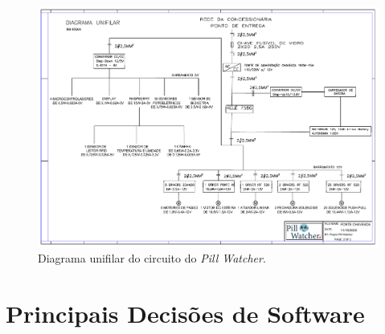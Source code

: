 \begin{apendicesenv}
\begin{landscape}
\begin{figure}[!htb]
    \centering
     \includegraphics[width=1.2\textwidth, height=2\textheight,keepaspectratio]{figuras/diagrama.pdf}
    \caption{Diagrama unifilar do circuito do \textit{Pill Watcher}.}
    \label{fig:diagrama_fonte2}
\end{figure}
\end{landscape}


\chapter{Principais Decisões de Software}\label{principais_decisoes_software}

\vspace{1cm}


\end{apendicesenv}
